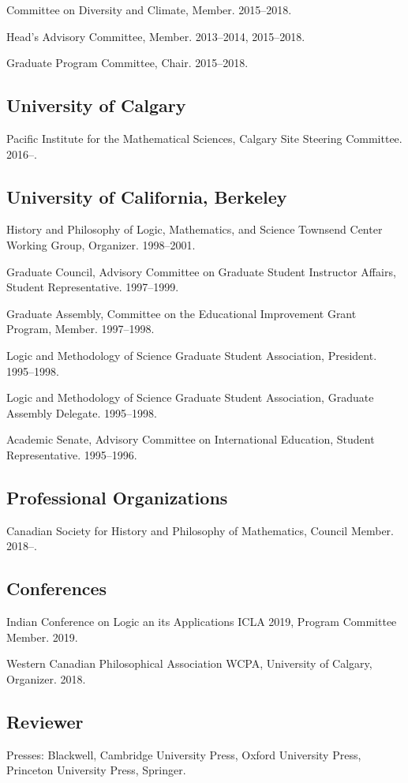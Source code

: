 \documentclass[11pt]{article}
\begin{document}
\ind Committee on Diversity and Climate, Member. 2015--2018.

\ind Head's Advisory Committee, Member. 2013--2014, 2015--2018.

\ind Graduate Program Committee, Chair. 2015--2018.

\subsection{University of Calgary}
\ind Pacific Institute for the Mathematical Sciences, Calgary Site Steering
Committee. 2016--.

\subsection{University of California, Berkeley}
\ind History and Philosophy of Logic, Mathematics, and Science Townsend
Center Working Group, Organizer. 1998--2001.

\ind Graduate Council, Advisory Committee on Graduate Student Instructor
Affairs, Student Representative. 1997--1999.

\ind Graduate Assembly, Committee on the Educational Improvement Grant
Program, Member. 1997--1998.

\ind Logic and Methodology of Science Graduate Student Association, President. 1995--1998.

\ind Logic and Methodology of Science Graduate Student Association, Graduate
Assembly Delegate. 1995--1998.

\ind Academic Senate, Advisory Committee on International Education, Student
Representative. 1995--1996.

\subsection{Professional Organizations}
\ind Canadian Society for History and Philosophy of Mathematics, Council
Member. 2018--.

\subsection{Conferences}
\ind Indian Conference on Logic an its Applications ICLA 2019, Program
Committee Member. 2019.

\ind Western Canadian Philosophical Association WCPA, University of Calgary,
Organizer. 2018.

\subsection{Reviewer}
\ind Presses: Blackwell, Cambridge University Press, Oxford University Press,
Princeton University Press, Springer. 
\end{document}
